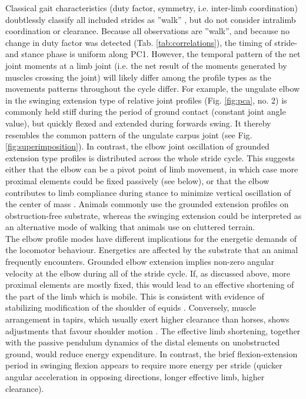 Classical gait characteristics (duty factor, symmetry, i.e. inter-limb coordination) doubtlessly classify all included strides as ''walk'' \citep{Hildebrand1989}, but do not consider intralimb coordination or clearance.
Because all observations are ''walk'', and because no change in duty factor was detected (Tab. \ref{tab:correlations}), the timing of stride- and stance phase is uniform along PC1.
However, the temporal pattern of the net joint moments at a limb joint (i.e. the net result of the moments generated by muscles crossing the joint) will likely differ among the profile types as the movements patterns throughout the cycle differ.
For example, the ungulate elbow in the swinging extension type of relative joint profiles (Fig. \ref{fig:pca}, no. 2) is commonly held stiff during the period of ground contact (constant joint angle value), but quickly flexed and extended during forwards swing.
It thereby resembles the common pattern of the ungulate carpus joint (see Fig. \ref{fig:superimposition}).
In contrast, the elbow joint oscillation of grounded extension type profiles is distributed across the whole stride cycle.
This suggests either that the elbow can be a pivot point of limb movement, in which case more proximal elements could be fixed passively (see below), or that the elbow contributes to limb compliance during stance to minimize vertical oscillation of the center of mass \cite[\textit{cf.}][]{Geyer2006}.
Animals commonly use the grounded extension profiles on obstruction-free substrate, whereas the swinging extension could be interpreted as an alternative mode of walking that animals use on cluttered terrain.
\\The elbow profile modes have different implications for the energetic demands of the locomotor behaviour.
Energetics are affected by the substrate that an animal frequently encounters.
Grounded elbow extension implies non-zero angular velocity at the elbow during all of the stride cycle.
If, as discussed above, more proximal elements are mostly fixed, this would lead to an effective shortening of the part of the limb which is mobile.
This is consistent with evidence of stabilizing modification of the shoulder of equids \cite[][]{Hermanson1992}.
Conversely, muscle arrangement in tapirs, which usually exert higher clearance than horses, shows adjustments that favour shoulder motion \citep{MacLaren2016}.
The effective limb shortening, together with the passive pendulum dynamics of the distal elements on unobstructed ground, would reduce energy expenditure.
In contrast, the brief flexion-extension period in swinging flexion appears to require more energy per stride (quicker angular acceleration in opposing directions, longer effective limb, higher clearance).
